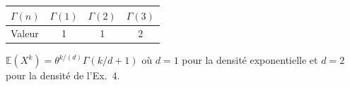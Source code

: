 \documentclass[11pt,a4paper]{article}
\newcommand{\E}{\mathbb{E}}
\begin{document}
\begin{methbox}
\centering
\renewcommand{\arraystretch}{1.3}
\begin{tabular}{lccc}
\toprule
$\Gamma(n)$ & $\Gamma(1)$ & $\Gamma(2)$ & $\Gamma(3)$ \\
\midrule
Valeur & 1 & 1 & 2 \\
\bottomrule
\end{tabular}

\medskip
$\E(X^k) = \theta^{k/(d)}\Gamma(k/d+1)$ o\`u $d=1$ pour la densit\'e exponentielle et $d=2$ pour la densit\'e de l'Ex.~4.
\end{methbox}
\end{document}
